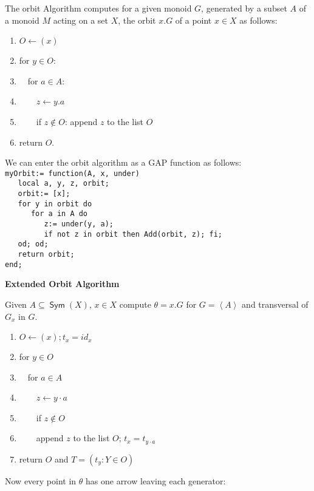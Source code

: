 \documentclass[12pt]{amsart}
\theoremstyle{definition}
\DeclareMathOperator{\Sym}{\mathsf{Sym}}
\begin{document}
The orbit Algorithm computes for a given monoid $G$, generated by a subset $A$ of a monoid $M$ acting on a set $X$, the orbit $x.G$ of a point $x\in X$ as follows:\\
\begin{enumerate}
\item $O\leftarrow (x)$
\item for $y\in O$:
\item \ \ for $a\in A$:
\item \ \ \ \ $z\leftarrow y.a$
\item \ \ \ \ if $z\not\in O$: append $z$ to the list $O$
\item return $O$.
\end{enumerate}
We can enter the orbit algorithm as a GAP function as follows:\\
\verb"myOrbit:= function(A, x, under)"\\
\verb"   local a, y, z, orbit;"\\
\verb"   orbit:= [x];"\\
\verb"   for y in orbit do"\\
\verb"      for a in A do"\\
\verb"         z:= under(y, a);"\\
\verb"         if not z in orbit then Add(orbit, z); fi;"\\
\verb"   od; od;"\\
\verb"   return orbit;"\\
\verb"end;"

\begin{center}
\textbf{Extended Orbit Algorithm}
\end{center}

Given $A \subseteq \Sym(X)$, $x \in X$ compute $\theta = x.G$ for $G = \left\langle A \right\rangle$ and transversal of $G_{x}$ in $G$.
\begin{enumerate}
\item $O \leftarrow (x); t_{x} = id_{x}$
\item for $y \in O$
\item \ \ for $a \in A$
\item \ \ \ \ $z \leftarrow y \cdot a$
\item \ \ \ \ if $z \not\in O$
\item \ \ \ \ append $z$ to the list $O$; $t_{x} = t_{y \cdot a}$
\item return $O$ and $T = \left( t_{y} : Y \in O \right)$
\end{enumerate}

Now every point in $\theta$ has one arrow leaving each generator:
\end{document}
